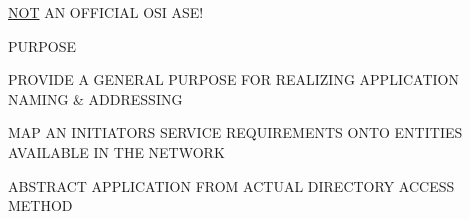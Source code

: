 %


%




\begin{bwslide}

\begin{nrtc}
\item	\underline{NOT} AN OFFICIAL OSI ASE!
\item	PURPOSE
	\begin{nrtc}
	\item	PROVIDE A GENERAL PURPOSE FOR REALIZING APPLICATION 
		NAMING \& ADDRESSING
	\item	MAP AN INITIATORS SERVICE REQUIREMENTS ONTO ENTITIES 
		AVAILABLE IN THE NETWORK
	\item	ABSTRACT APPLICATION FROM ACTUAL DIRECTORY ACCESS METHOD
	\end{nrtc}
\end{nrtc}
\end{bwslide}


